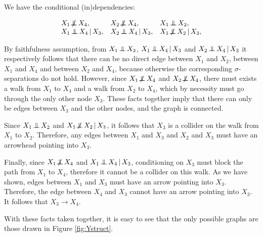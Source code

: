 \begin{enumerate}
	\begin{ungradedsolution}
		We have the conditional (in)dependencies:

		$$\begin{array}{lll}
				X_1 \nIndep X_4,           & X_2 \nIndep X_4,           & X_1 \Indep X_2,             \\
				X_1 \Indep X_4 \given X_3, & X_2 \Indep X_4 \given X_3, & X_1 \nIndep X_2 \given X_3,
			\end{array}$$

		By faithfulness assumption, from $X_1 \operatorname*{\perp\mkern-11mu\perp} X_2$, $X_1 \operatorname*{\perp\mkern-11mu\perp} X_4 \operatorname*{|} X_3$ and $ X_2 \operatorname*{\perp\mkern-11mu\perp} X_4 \operatorname*{|} X_3$ it respectively follows that there can be no direct edge between $X_1$ and $X_2$, between $X_1$ and $X_4$ and between $X_2$ and $X_4$, because otherwise the corresponding $\sigma$-separations do not hold. However, since $X_1 \operatorname*{\not\mkern-2mu\perp\mkern-11mu\perp} X_4$ and  $X_2 \operatorname*{\not\mkern-2mu\perp\mkern-11mu\perp} X_4$, there must exists a walk from $X_1$ to $X_4$ and a walk from $X_2$ to $X_4$, which by necessity must go through the only other node $X_3$. These facts together imply that there can only be edges between $X_3$ and the other nodes, and the graph is connected.

		Since $X_1 \operatorname*{\perp\mkern-11mu\perp} X_2$ and $X_1 \operatorname*{\not\mkern-2mu\perp\mkern-11mu\perp} X_2 \operatorname*{|} X_3$, it follows that $X_3$ is a collider on the walk from $X_1$ to $X_2$. Therefore, any edges between $X_1$ and $X_3$ and $X_2$ and $X_3$ must have an arrowhead pointing into $X_3$.

		Finally, since $X_1 \operatorname*{\not\mkern-2mu\perp\mkern-11mu\perp} X_4$ and $X_1 \operatorname*{\perp\mkern-11mu\perp} X_4 \operatorname*{|} X_3$, conditioning on $X_3$ must block the path from $X_1$ to $X_4$, therefore it cannot be a collider on this walk. As we have shown, edges between $X_1$ and $X_3$ must have an arrow pointing into $X_3$. Therefore, the edge between $X_4$ and $X_3$ cannot have an arrow pointing into $X_3$. It follows that $X_3 \to X_4$.

		With these facts taken together, it is easy to see that the only possible graphs are those drawn in Figure \ref*{fig:Ystruct}.
	\end{ungradedsolution}

\end{enumerate}

